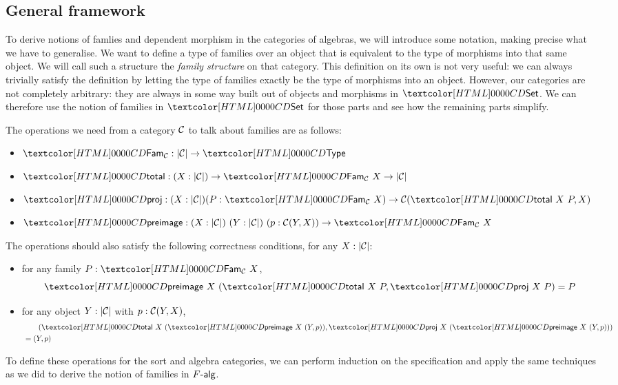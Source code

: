 \subsection{General framework}

To derive notions of famlies and dependent morphism in the categories
of algebras, we will introduce some notation, making precise what we
have to generalise. We want to define a type of families over an
object that is equivalent to the type of morphisms into that same
object. We will call such a structure the \emph{family structure} on
that category. This definition on its own is not very useful: we can
always trivially satisfy the definition by letting the type of
families exactly be the type of morphisms into an object. However, our
categories are not completely arbitrary: they are always in some way
built out of objects and morphisms in $\Set$. We can therefore use the
notion of families in $\Set$ for those parts and see how the remaining
parts simplify.

\begin{definition}
  The operations we need from a category $\mathcal{C}$ to talk about families
  are as follows:
%
  \begin{itemize}
  \item $\Fam_{\Cc} : | \Cc | \to \Type$
  \item $\total : (X : | \Cc |) \to \Fam_{\Cc}\ X \to | \Cc |$
  \item
    $\proj : (X : | \Cc |) (P : \Fam_{\Cc}\ X) \to \Cc(\total\ X\ P,
    X)$
  \item
    $\preimage : (X : | \Cc |)\ (Y : | \Cc |)\ (p : \Cc(Y,X)) \to
    \Fam_{\Cc}\ X$
  \end{itemize}
%
  The operations should also satisfy the following correctness
  conditions, for any $X : | \mathcal{C} |$:
%
  \begin{itemize}
  \item for any family $P : \Fam_{\Cc}\ X$,
  $$\preimage\ X\ (\total\ X\ P , \proj\ X\ P) = P$$
\item for any object $Y : | \mathcal{C} |$ with $p : \mathcal{C}(Y,X)$,
  \begin{align*}
    &\ \ \ \ \ \ (\total\ X\ (\preimage\ X\ (Y,p)) , \proj\ X\ (\preimage\ X\ (Y,p))) \\
    &= (Y,p)
  \end{align*}
\end{itemize}
%
\end{definition}
To define these operations for the sort and algebra categories, we can
perform induction on the specification and apply the same techniques
as we did to derive the notion of families in $\algcat{F}$.

